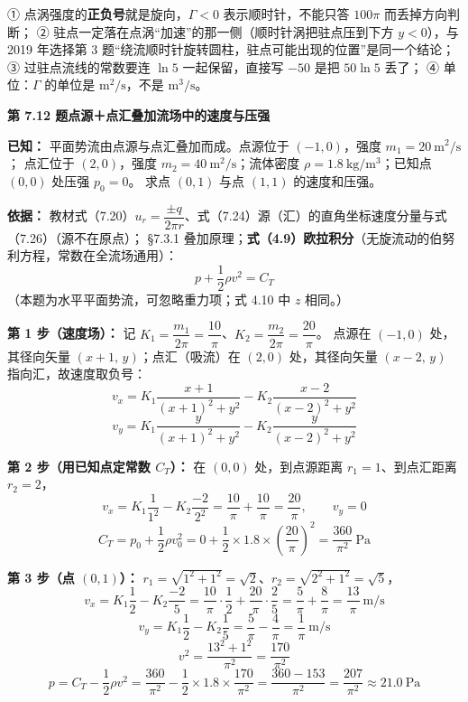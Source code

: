 \begin{yicuo}
① 点涡强度的\textbf{正负号}就是旋向，$\Gamma<0$ 表示顺时针，不能只答 $100\pi$ 而丢掉方向判断；
② 驻点一定落在点涡“加速”的那一侧（顺时针涡把驻点压到下方 $y<0$），与 2019 年选择第 3 题“绕流顺时针旋转圆柱，驻点可能出现的位置”是同一个结论；
③ 过驻点流线的常数要连 $\ln 5$ 一起保留，直接写 $-50$ 是把 $50\ln5$ 丢了；
④ 单位：$\Gamma$ 的单位是 $\mathrm{m^2/s}$，不是 $\mathrm{m^3/s}$。
\end{yicuo}

\noindent\textbf{第 7.12 题\quad 点源＋点汇叠加流场中的速度与压强}

\begin{jie}
\textbf{已知：} 平面势流由点源与点汇叠加而成。点源位于 $(-1,0)$，强度 $m_1=20\ \mathrm{m^2/s}$；
点汇位于 $(2,0)$，强度 $m_2=40\ \mathrm{m^2/s}$；流体密度 $\rho=1.8\ \mathrm{kg/m^3}$；已知点 $(0,0)$ 处压强 $p_0=0$。
求点 $(0,1)$ 与点 $(1,1)$ 的速度和压强。

\textbf{依据：} 教材式（7.20）$u_r=\dfrac{\pm q}{2\pi r}$、式（7.24）源（汇）的直角坐标速度分量与式（7.26）（源不在原点）；
\S7.3.1 叠加原理；\textbf{式（4.9）欧拉积分}（无旋流动的伯努利方程，常数在全流场通用）：
\[
p+\frac{1}{2}\rho v^2=C_T
\]
（本题为水平平面势流，可忽略重力项；式 4.10 中 $z$ 相同。）

\textbf{第 1 步（速度场）：} 记 $K_1=\dfrac{m_1}{2\pi}=\dfrac{10}{\pi}$、$K_2=\dfrac{m_2}{2\pi}=\dfrac{20}{\pi}$。
点源在 $(-1,0)$ 处，其径向矢量 $(x+1,\,y)$；点汇（吸流）在 $(2,0)$ 处，其径向矢量 $(x-2,\,y)$ 指向汇，故速度取负号：
\[
v_x=K_1\frac{x+1}{(x+1)^2+y^2}-K_2\frac{x-2}{(x-2)^2+y^2}
\]
\[
v_y=K_1\frac{y}{(x+1)^2+y^2}-K_2\frac{y}{(x-2)^2+y^2}
\]

\textbf{第 2 步（用已知点定常数 $C_T$）：} 在 $(0,0)$ 处，到点源距离 $r_1=1$、到点汇距离 $r_2=2$，
\[
v_x=K_1\frac{1}{1^2}-K_2\frac{-2}{2^2}=\frac{10}{\pi}+\frac{10}{\pi}=\frac{20}{\pi},\qquad v_y=0
\]
\[
C_T=p_0+\frac{1}{2}\rho v_0^2=0+\frac{1}{2}\times 1.8\times\left(\frac{20}{\pi}\right)^2
=\frac{360}{\pi^2}\ \mathrm{Pa}
\]

\textbf{第 3 步（点 $(0,1)$）：} $r_1=\sqrt{1^2+1^2}=\sqrt2$、$r_2=\sqrt{2^2+1^2}=\sqrt5$，
\[
v_x=K_1\frac{1}{2}-K_2\frac{-2}{5}=\frac{10}{\pi}\cdot\frac{1}{2}+\frac{20}{\pi}\cdot\frac{2}{5}=\frac{5}{\pi}+\frac{8}{\pi}=\frac{13}{\pi}\ \mathrm{m/s}
\]
\[
v_y=K_1\frac{1}{2}-K_2\frac{1}{5}=\frac{5}{\pi}-\frac{4}{\pi}=\frac{1}{\pi}\ \mathrm{m/s}
\]
\[
v^2=\frac{13^2+1^2}{\pi^2}=\frac{170}{\pi^2}
\]
\[
p=C_T-\frac{1}{2}\rho v^2=\frac{360}{\pi^2}-\frac{1}{2}\times 1.8\times\frac{170}{\pi^2}
=\frac{360-153}{\pi^2}=\frac{207}{\pi^2}\approx 21.0\ \mathrm{Pa}
\]


\end{jie}
